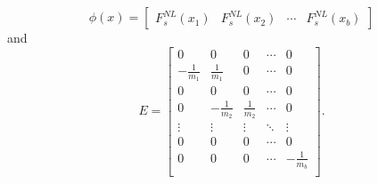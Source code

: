 \begin{equation}
    \phi(x) =
    \begin{bmatrix}
        F_s^{NL}(x_1) & F_s^{NL}(x_2) & \cdots & F_s^{NL}(x_b)
    \end{bmatrix}
\end{equation}
and
\begin{equation}\label{eqn:msd-E}
    E =
    \begin{bmatrix}
        0 & 0 & 0 & \cdots & 0 \\
        -\frac{1}{m_1} & \frac{1}{m_1} & 0 & \cdots & 0 \\
        0 & 0 & 0 & \cdots & 0 \\
        0 & -\frac{1}{m_2} & \frac{1}{m_2} & \cdots & 0 \\
        \vdots & \vdots & \vdots & \ddots & \vdots \\
        0 & 0 & 0 & \cdots & 0 \\
        0 & 0 & 0 & \cdots & -\frac{1}{m_b} \\
    \end{bmatrix}.
\end{equation}


